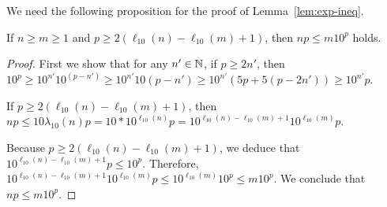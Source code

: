 We need the following proposition for the proof of Lemma~\ref{lem:exp-ineq}.

\begin{proposition} \label{prop:1}
If $n\ge m\ge 1$ and $p \ge 2(\ell_{10}(n)- \ell_{10}(m)+1)$, then 
$n p \le m10^p$ holds.
\end{proposition}

\begin{proof}

First we show that for any $n' \in \mathbb{N}$, if $p \ge 2n'$, then $10^p \ge 10^{n'}10^{(p-n')}\ge 10^{n'}10(p-n')\ge 10^{n'}(5p+5(p-2n'))\ge  10^{n'}p$.

If $ p \ge 2 (\ell_{10}(n) - \ell_{10}(m)+1)$, then  $n p \le 10\lambda_{10}(n) p = 10 * 10^{\ell_{10}(n)} p = 10^{\ell_{10}(n)-\ell_{10}(m) + 1}  10^{\ell_{10}(m)} p$.

Because $p \ge 2(\ell_{10}(n)-\ell_{10}(m) + 1)$, we deduce that $10^{\ell_{10}(n)-\ell_{10}(m) + 1}  p \le 10^p$.  Therefore, $10^{\ell_{10}(n)-\ell_{10}(m) + 1}  10^{\ell_{10}(m)} p \le 10^{\ell_{10}(m)} 10^p \le m 10^p$.
We conclude that $np \le m 10^p$.
\end{proof}


